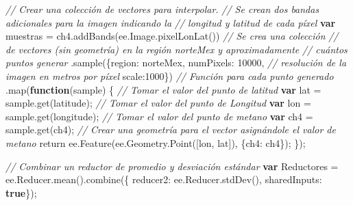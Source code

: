 \documentclass[
  12pt,
  letterpaper,
  twoside]{book}
\newenvironment{Shaded}{\begin{snugshade}}{\end{snugshade}}
\newcommand{\AttributeTok}[1]{\textcolor[rgb]{0.48,0.12,0.64}{#1}}
\newcommand{\CommentTok}[1]{\textcolor[rgb]{0.24,0.58,0.00}{\textit{#1}}}
\newcommand{\ControlFlowTok}[1]{\textcolor[rgb]{0.00,0.00,0.00}{#1}}
\newcommand{\DataTypeTok}[1]{\textcolor[rgb]{0.00,0.00,0.00}{#1}}
\newcommand{\DecValTok}[1]{\textcolor[rgb]{0.28,0.53,0.93}{#1}}
\newcommand{\FunctionTok}[1]{\textcolor[rgb]{0.48,0.12,0.64}{#1}}
\newcommand{\KeywordTok}[1]{\textcolor[rgb]{0.00,0.00,0.00}{\textbf{#1}}}
\newcommand{\NormalTok}[1]{#1}
\newcommand{\OperatorTok}[1]{\textcolor[rgb]{0.00,0.00,0.00}{#1}}
\newcommand{\StringTok}[1]{\textcolor[rgb]{0.87,0.29,0.22}{#1}}
\begin{document}
\begin{Shaded}
\begin{Highlighting}[]
\CommentTok{// Crear una colección de vectores para interpolar.}
\CommentTok{// Se crean dos bandas adicionales para la imagen indicando la }
\CommentTok{// longitud y latitud de cada píxel}
\KeywordTok{var}\NormalTok{ muestras }\OperatorTok{=}\NormalTok{ ch4}\OperatorTok{.}\FunctionTok{addBands}\NormalTok{(ee}\OperatorTok{.}\AttributeTok{Image}\OperatorTok{.}\FunctionTok{pixelLonLat}\NormalTok{()) }
  \CommentTok{// Se crea una colección }
  \CommentTok{// de vectores (sin geometría) en la región norteMex y aproximadamente }
  \CommentTok{// cuántos puntos generar}
  \OperatorTok{.}\FunctionTok{sample}\NormalTok{(\{}\DataTypeTok{region}\OperatorTok{:}\NormalTok{ norteMex}\OperatorTok{,} \DataTypeTok{numPixels}\OperatorTok{:} \DecValTok{10000}\OperatorTok{,} 
    \CommentTok{// resolución de la imagen en metros por píxel}
    \DataTypeTok{scale}\OperatorTok{:}\DecValTok{1000}\NormalTok{\}) }
  \CommentTok{// Función para cada punto generado}
  \OperatorTok{.}\FunctionTok{map}\NormalTok{(}\KeywordTok{function}\NormalTok{(sample) \{ }
    \CommentTok{// Tomar el valor del punto de latitud}
    \KeywordTok{var}\NormalTok{ lat }\OperatorTok{=}\NormalTok{ sample}\OperatorTok{.}\FunctionTok{get}\NormalTok{(}\StringTok{\textquotesingle{}latitude\textquotesingle{}}\NormalTok{)}\OperatorTok{;} 
    \CommentTok{// Tomar el valor del punto de Longitud}
    \KeywordTok{var}\NormalTok{ lon }\OperatorTok{=}\NormalTok{ sample}\OperatorTok{.}\FunctionTok{get}\NormalTok{(}\StringTok{\textquotesingle{}longitude\textquotesingle{}}\NormalTok{)}\OperatorTok{;} 
    \CommentTok{// Tomar el valor del punto de metano}
    \KeywordTok{var}\NormalTok{ ch4 }\OperatorTok{=}\NormalTok{ sample}\OperatorTok{.}\FunctionTok{get}\NormalTok{(}\StringTok{\textquotesingle{}ch4\textquotesingle{}}\NormalTok{)}\OperatorTok{;} 
    \CommentTok{// Crear una geometría para el vector asignándole el valor de metano}
    \ControlFlowTok{return}\NormalTok{ ee}\OperatorTok{.}\FunctionTok{Feature}\NormalTok{(ee}\OperatorTok{.}\AttributeTok{Geometry}\OperatorTok{.}\FunctionTok{Point}\NormalTok{([lon}\OperatorTok{,}\NormalTok{ lat])}\OperatorTok{,}\NormalTok{ \{}\DataTypeTok{ch4}\OperatorTok{:}\NormalTok{ ch4\})}\OperatorTok{;}
\NormalTok{  \})}\OperatorTok{;}

\CommentTok{// Combinar un reductor de promedio y desviación estándar}
\KeywordTok{var}\NormalTok{ Reductores }\OperatorTok{=}\NormalTok{ ee}\OperatorTok{.}\AttributeTok{Reducer}\OperatorTok{.}\FunctionTok{mean}\NormalTok{()}\OperatorTok{.}\FunctionTok{combine}\NormalTok{(\{}
  \DataTypeTok{reducer2}\OperatorTok{:}\NormalTok{ ee}\OperatorTok{.}\AttributeTok{Reducer}\OperatorTok{.}\FunctionTok{stdDev}\NormalTok{()}\OperatorTok{,}
  \DataTypeTok{sharedInputs}\OperatorTok{:} \KeywordTok{true}\NormalTok{\})}\OperatorTok{;}


\end{Highlighting}
\end{Shaded}
\end{document}
